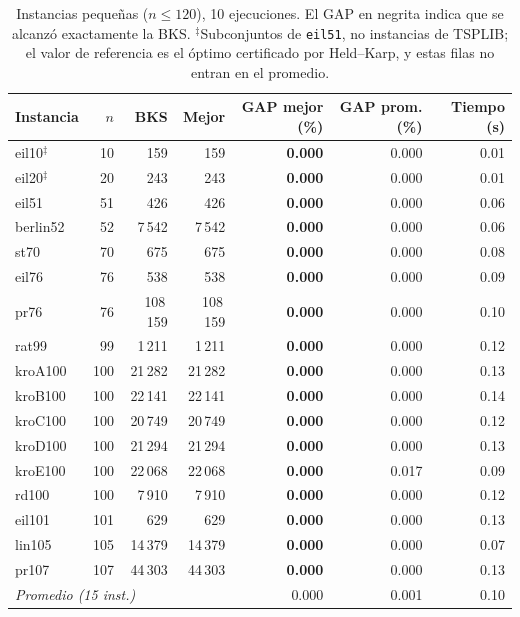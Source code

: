 \documentclass[runningheads]{llncs}
\begin{document}
\begin{table}
\caption{Instancias pequeñas ($n\le 120$), 10 ejecuciones. El GAP en
negrita indica que se alcanzó exactamente la BKS.
$^{\ddagger}$Subconjuntos de \texttt{eil51}, no instancias de TSPLIB; el
valor de referencia es el óptimo certificado por Held--Karp, y estas
filas no entran en el promedio.}
\label{tab:small}
\centering\scriptsize
\begin{tabular}{@{}lrrrrrr@{}}
\toprule
\textbf{Instancia} & $n$ & \textbf{BKS} & \textbf{Mejor} & \textbf{GAP mejor (\%)} & \textbf{GAP prom. (\%)} & \textbf{Tiempo (s)}\\
\midrule
eil10$^{\ddagger}$ & 10 & 159 & 159 & \textbf{0.000} & 0.000 & 0.01 \\
eil20$^{\ddagger}$ & 20 & 243 & 243 & \textbf{0.000} & 0.000 & 0.01 \\
eil51 & 51 & 426 & 426 & \textbf{0.000} & 0.000 & 0.06 \\
berlin52 & 52 & 7\,542 & 7\,542 & \textbf{0.000} & 0.000 & 0.06 \\
st70 & 70 & 675 & 675 & \textbf{0.000} & 0.000 & 0.08 \\
eil76 & 76 & 538 & 538 & \textbf{0.000} & 0.000 & 0.09 \\
pr76 & 76 & 108\,159 & 108\,159 & \textbf{0.000} & 0.000 & 0.10 \\
rat99 & 99 & 1\,211 & 1\,211 & \textbf{0.000} & 0.000 & 0.12 \\
kroA100 & 100 & 21\,282 & 21\,282 & \textbf{0.000} & 0.000 & 0.13 \\
kroB100 & 100 & 22\,141 & 22\,141 & \textbf{0.000} & 0.000 & 0.14 \\
kroC100 & 100 & 20\,749 & 20\,749 & \textbf{0.000} & 0.000 & 0.12 \\
kroD100 & 100 & 21\,294 & 21\,294 & \textbf{0.000} & 0.000 & 0.13 \\
kroE100 & 100 & 22\,068 & 22\,068 & \textbf{0.000} & 0.017 & 0.09 \\
rd100 & 100 & 7\,910 & 7\,910 & \textbf{0.000} & 0.000 & 0.12 \\
eil101 & 101 & 629 & 629 & \textbf{0.000} & 0.000 & 0.13 \\
lin105 & 105 & 14\,379 & 14\,379 & \textbf{0.000} & 0.000 & 0.07 \\
pr107 & 107 & 44\,303 & 44\,303 & \textbf{0.000} & 0.000 & 0.13 \\
\midrule
\multicolumn{4}{l}{\textit{Promedio (15 inst.)}} & 0.000 & 0.001 & 0.10 \\
\bottomrule
\end{tabular}
\end{table}
\end{document}
